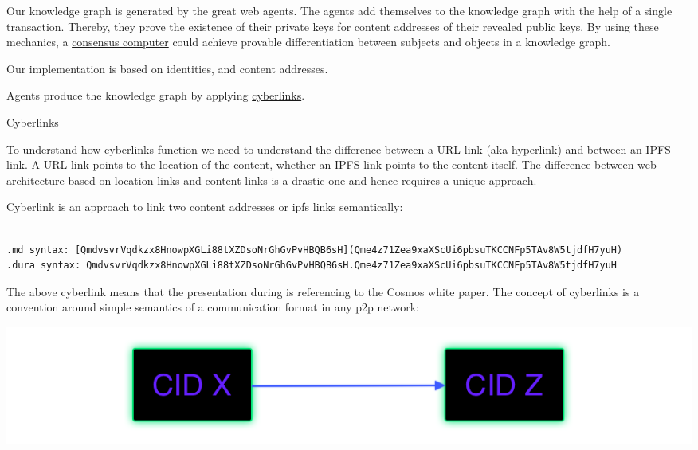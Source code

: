 \documentclass[8pt,oneside]{amsart}
\makeatletter
\newcommand{\linkred}[2]{\href{#1}{\color{red}{#2}}}
\renewcommand\subsection{\@startsection{subsection}
                                    {2}{\z@}
                                    {-3.25ex\@plus -1ex \@minus -.2ex}
                                    {0ex \@plus .2ex}
                                    {\play\Large}
                        }
\newcommand{\titleSection}[1]{\subsection{#1}}
\newenvironment{Figure}
  {\par\medskip\noindent\minipage{\linewidth}}
  {\endminipage\par\medskip}
\makeatother
\begin{document}
Our knowledge graph is generated by the great web agents. The agents add themselves to the knowledge graph with the help of a single transaction. Thereby, they prove the existence of their private keys for content addresses of their revealed public keys. By using these mechanics, a {\hyperref[consensus-computer]{consensus computer}} could achieve provable differentiation between subjects and objects in a knowledge graph.

Our \linkred{https://github.com/cybercongress/cyberd}{cyberd} implementation is based on \linkred{https://github.com/cosmos/cosmos-sdk}{cosmos-SDK} identities, and \linkred{https://github.com/multiformats/cid#cidv0}{CIDv0/CIDv1} content addresses.

Agents produce the knowledge graph by applying {\hyperref[cyberlinks]{cyberlinks}}.

\titleSection{Cyberlinks}\label{cyberlinks}

To understand how cyberlinks function we need to understand the difference between a URL link (aka hyperlink) and between an IPFS link. A URL link points to the location of the content, whether an IPFS link points to the content itself. The difference between web architecture based on location links and content links is a drastic one and hence requires a unique approach.

{Cyberlink} is an approach to link two content addresses or {ipfs links} semantically:

\begin{lstlisting}

.md syntax: [QmdvsvrVqdkzx8HnowpXGLi88tXZDsoNrGhGvPvHBQB6sH](Qme4z71Zea9xaXScUi6pbsuTKCCNFp5TAv8W5tjdfH7yuH)
.dura syntax: QmdvsvrVqdkzx8HnowpXGLi88tXZDsoNrGhGvPvHBQB6sH.Qme4z71Zea9xaXScUi6pbsuTKCCNFp5TAv8W5tjdfH7yuH
\end{lstlisting}

The above cyberlink means that the \linkred{https://github.com/cybercongress/cyberd}{cyberd} presentation during \linkred{https://etherscan.io/token/0x61B81103e716B611Fff8aF5A5Dc8f37C628efb1E}{cyberc0n} is referencing to the Cosmos white paper. The concept of cyberlinks is a convention around simple semantics of a communication format in any p2p network:

\begin{Figure}
    \centering
    \includegraphics[width=1\textwidth]{cyberlink.png}
\end{Figure}
\end{document}
